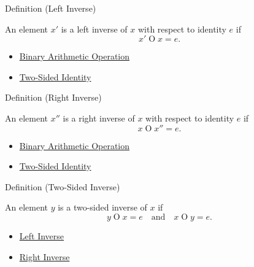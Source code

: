 \begin{definitionbox}{Definition (Left Inverse)}
\begin{definition}
\label{def:left-inverse}
An element $x'$ is a left inverse of $x$ with respect to identity $e$ if
\[
x'\mathbin{O}x=e.
\]
\end{definition}
\end{definitionbox}

\begin{dependencies}
\begin{itemize}
  \item \hyperref[def:binary-arithmetic-operation]{Binary Arithmetic Operation}
  \item \hyperref[def:two-sided-identity]{Two-Sided Identity}
\end{itemize}
\end{dependencies}

\begin{definitionbox}{Definition (Right Inverse)}
\begin{definition}
\label{def:right-inverse}
An element $x''$ is a right inverse of $x$ with respect to identity $e$ if
\[
x\mathbin{O}x''=e.
\]
\end{definition}
\end{definitionbox}

\begin{dependencies}
\begin{itemize}
  \item \hyperref[def:binary-arithmetic-operation]{Binary Arithmetic Operation}
  \item \hyperref[def:two-sided-identity]{Two-Sided Identity}
\end{itemize}
\end{dependencies}

\begin{definitionbox}{Definition (Two-Sided Inverse)}
\begin{definition}
\label{def:two-sided-inverse}
An element $y$ is a two-sided inverse of $x$ if
\[
y\mathbin{O}x=e
\quad\text{and}\quad
x\mathbin{O}y=e.
\]
\end{definition}
\end{definitionbox}

\begin{dependencies}
\begin{itemize}
  \item \hyperref[def:left-inverse]{Left Inverse}
  \item \hyperref[def:right-inverse]{Right Inverse}
\end{itemize}
\end{dependencies}

